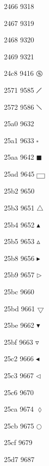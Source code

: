 \documentclass[11pt]{article}
\begin{document}
2466 9318 

2467 9319 

2468 9320 

2469 9321 

24c8 9416 \ensuremath{\circledS}



2571 9585 \ensuremath{\diagup}

2572 9586 \ensuremath{\diagdown}

25a0 9632 \blacksquare

25a1 9633 \ensuremath{\square}

25aa 9642 \ensuremath{\blacksquare}

25ad 9645 \ensuremath{\fbox{~~}}



25b2 9650 

25b3 9651 \ensuremath{\bigtriangleup}

25b4 9652 \ensuremath{\blacktriangle}

25b5 9653 \ensuremath{\vartriangle}

25b8 9656 \ensuremath{\blacktriangleright}

25b9 9657 \ensuremath{\triangleright}

25bc 9660 

25bd 9661 \ensuremath{\bigtriangledown}

25be 9662 \ensuremath{\blacktriangledown}

25bf 9663 \ensuremath{\triangledown}

25c2 9666 \ensuremath{\blacktriangleleft}

25c3 9667 \ensuremath{\triangleleft}

25c6 9670 

25ca 9674 \ensuremath{\lozenge}

25cb 9675 \ensuremath{\bigcirc}

25cf 9679 




25d7 9687 

\end{document}
